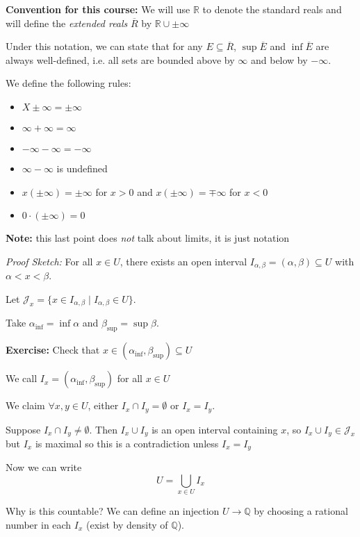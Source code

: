 \documentclass[12pt]{article}
\newcommand{\R}{\mathbb{R}}
\newcommand{\Q}{\mathbb{Q}}
\newcommand{\sub}{\subseteq}
\renewcommand{\bar}[1]{\overline{#1}}
\newenvironment*{tbox}[2][gray]{
    \begin{tcolorbox}[
        parbox=false,
        colback=#1!5!white,
        colframe=#1!75!black,
        breakable,
        title={#2}
    ]}
    {\end{tcolorbox}}
\newenvironment*{exercise}[1][red]{
    \begin{tcolorbox}[
        parbox=false,
        colback=#1!5!white,
        colframe=#1!75!black,
        breakable
    ]}
    {\end{tcolorbox}}
\begin{document}
    \textbf{Convention for this course:} We will use $\R$ to denote the standard reals and will define the \emph{extended reals} $\bar R$ by $\R \cup \pm \infty$ 

    Under this notation, we can state that for any $E \sub \bar R$, $\sup \bar E$ and $\inf \bar E$ are always well-defined, i.e. all sets are bounded above by $\infty$ and below by $-\infty$.

    We define the following rules: 
    \begin{itemize}
        \item $X \pm  \infty = \pm \infty$ 
        \item $\infty + \infty = \infty$
        \item $-\infty - \infty = -\infty$
        \item $\infty - \infty$ is undefined
        \item $x(\pm \infty) = \pm \infty$ for $x > 0$ and $x(\pm \infty) = \mp \infty$ for $x < 0$
        \item $0 \cdot (\pm\infty) = 0$
    \end{itemize}

    \textbf{Note:} this last point does \emph{not} talk about limits, it is just notation 

    \begin{tbox}{\textbf{Proposition:} Every open set in $\R$ is a countable disjoint union of open intervals}
        \emph{Proof Sketch:} For all $x \in U$, there exists an open interval $I_{\alpha, \beta} = (\alpha, \beta) \sub U$ with $\alpha < x < \beta$. 

        Let $\mathcal J_x = \{x \in I_{\alpha, \beta} \; | \; I_{\alpha, \beta} \in U\}$. 

        Take $\alpha_{\inf} = \inf \mathcal \alpha$ and $\beta_{\sup} = \sup \beta$. 

        \begin{exercise}
            \textbf{Exercise:} Check that $x \in (\alpha_{\inf}, \beta_{\sup}) \sub U$
        \end{exercise}

        We call $I_x = (\alpha_{\inf}, \beta_{\sup})$ for all $x \in U$ 

        We claim $\forall x, y \in U$, either $I_x \cap I_y = \emptyset$ or $I_x = I_y$.

        Suppose $I_x \cap I_y \neq \emptyset$. Then $I_x \cup I_y$ is an open interval containing $x$, so $I_x \cup I_y \in \mathcal J_x$ but $I_x$ is maximal so this is a contradiction unless $I_x = I_y$ 

        Now we can write 
        \[U = \bigcup_{x \in U} I_x\]

        Why is this countable? We can define an injection $U \to \Q$ by choosing a rational number in each $I_x$ (exist by density of $\Q$). 
    \end{tbox}
\end{document}
